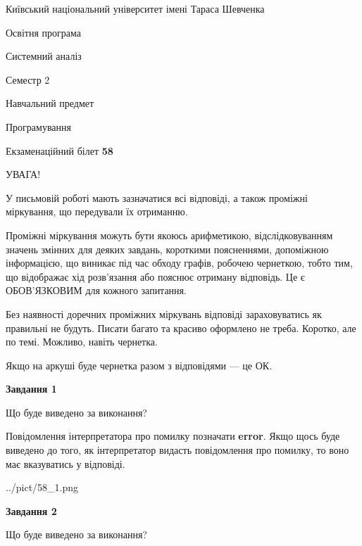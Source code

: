 \documentclass[12pt, ukrainian]{article}
\begin{document}
{{\begin {small}\par
{ \center  Київський національний університет імені Тараса Шевченка \par}
{\parbox {5 cm}{Освітня програма \hfill}{\parbox {7 cm}{Системний аналіз \hfill}}\parbox {6 cm}{\hfill Семестр 2}}\par
{\parbox {5 cm} {Навчальний предмет \hfill}\parbox {7 cm}{Програмування \hfill}\parbox {6cm}{\hfill}\par}\vspace{-7pt} \end{small}}{\center Екзаменаційний білет \No \textbf
{ 58 }\par}}
{
\begin {large}
УВАГА!

У письмовій роботі мають зазначатися всі відповіді, а також проміжні міркування, що передували їх отриманню.

Проміжні міркування можуть бути якоюсь арифметикою, відслідковуванням зна\-чень змінних для деяких завдань,
короткими поясненнями, допоміжною інформацією, що виникає під час обходу графів, робочею чернеткою,
тобто тим, що відображає хід розв’язання або пояснює отриману відповідь.
Це є ОБОВ’ЯЗКОВИМ для кожного запитання.

Без наявності доречних проміжних міркувань відповіді зараховуватись як правиль\-ні не будуть.
Писати багато та красиво оформлено не треба. Коротко, але по темі. Можли\-во, навіть чернетка.

Якщо на аркуші буде чернетка разом з відповідями --- це ОК.

\newpage

{\begin {center}\textbf{Завдання 1}\end {center}}\par
Що буде виведено за виконання?

Повідомлення інтерпретатора про помилку позначати \textbf{error}.
Якщо щось буде виведено до того, як інтерпретатор видасть повідомлення про помилку, 
то воно має вказуватись у відповіді. \par


\begin{center}
	{../pict/58_1.png}
\end{center}
\newpage

{\begin {center}\textbf{Завдання 2}\end {center}}\par
Що буде виведено за виконання?


\end{large}}
\end{document}
